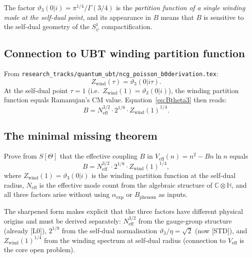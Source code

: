 \documentclass[12pt,a4paper]{article}
\theoremstyle{remark}
\begin{document}
The factor $\vartheta_3(0|i) = \pi^{1/4}/\Gamma(3/4)$ is the
\emph{partition function of a single winding mode at the self-dual point},
and its appearance in $B$ means that $B$ is sensitive to the
self-dual geometry of the $S^1_\psi$ compactification.

\subsection{Connection to UBT winding partition function}

From \texttt{research\_tracks/quantum\_ubt/ncg\_poisson\_b0derivation.tex}:
\[
Z_{\mathrm{wind}}(\tau) = \vartheta_3(0|i\tau).
\]
At the self-dual point $\tau=1$ (i.e.\ $Z_{\mathrm{wind}}(1) = \vartheta_3(0|i)$),
the winding partition function equals Ramanujan's CM value.
Equation~\eqref{eq:Btheta3} then reads:
\begin{equation}
  B = N_{\mathrm{eff}}^{3/2}\cdot 2^{1/8}\cdot Z_{\mathrm{wind}}(1)^{1/4}.
  \label{eq:Bzwind}
\end{equation}

\subsection{The minimal missing theorem}

\begin{tcolorbox}[colback=red!4!white, colframe=red!60!black,
  title={Minimal Missing Theorem — Gap G137-B (sharpened)}]
Prove from $S[\Theta]$ that the effective coupling $B$ in
$V_{\mathrm{eff}}(n) = n^2 - Bn\ln n$ equals
\[
B = N_{\mathrm{eff}}^{3/2}\cdot 2^{1/8}\cdot Z_{\mathrm{wind}}(1)^{1/4},
\]
where $Z_{\mathrm{wind}}(1) = \vartheta_3(0|i)$ is the winding partition
function at the self-dual radius, $N_{\mathrm{eff}}$ is the effective
mode count from the algebraic structure of $\mathbb{C}\otimes\mathbb{H}$,
and all three factors arise without using $\alpha_{\mathrm{exp}}$ or
$B_{\mathrm{phenom}}$ as inputs.
\end{tcolorbox}

The sharpened form makes explicit that the three factors have
different physical origins and must be derived separately:
$N_{\mathrm{eff}}^{3/2}$ from the gauge-group structure (already [L0]),
$2^{1/8}$ from the self-dual normalisation $\vartheta_3/\eta=\sqrt{2}$ (now [STD]),
and $Z_{\mathrm{wind}}(1)^{1/4}$ from the winding spectrum at self-dual radius
(connection to $V_{\mathrm{eff}}$ is the core open problem).

\end{document}
